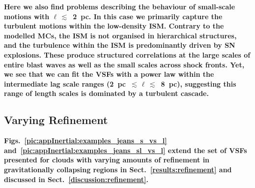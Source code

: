 \textbf{Here we also find problems describing the behaviour of
        small-scale motions with $\ell\,\lesssim$~2~pc.
        In this case we primarily capture the turbulent motions within
        the low-density ISM. 
Contrary to the modelled MCs, the ISM is not organised in hierarchical structures,
    and 
the turbulence within the ISM is predominantly driven by SN explosions.
      These produce structured correlations at the large scales of entire
      blast waves as well as the small scales across shock fronts.
	Yet, we see that we can fit the VSFs with a power law within
        the intermediate lag scale ranges
        (2~pc~$\lesssim\,\ell\,\lesssim$~8~pc), 
      suggesting this range of length scales is dominated by a
      turbulent cascade.
}

\subsection{Varying Refinement} \label{Bsub:Jeans}
\textbf{Figs.~\ref{pic:appInertial:examples_jeans_s_vs_l}
  and~\ref{pic:appInertial:examples_jeans_sl_vs_l} extend the set of
  VSFs presented for clouds with varying amounts of refinement in
  gravitationally collapsing regions in Sect.~\ref{results:refinement}
  and discussed in Sect.~\ref{discussion:refinement}.
}


